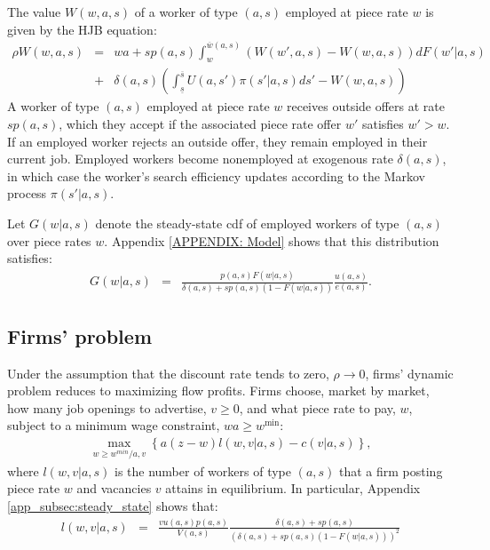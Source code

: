 The value $W(w,a,s)$ of a worker of type $(a,s)$ employed at piece rate $w$ is given by the HJB equation:
%
\begin{eqnarray}
  \label{eq: value of employment}
  \rho W(w,a,s)	&=& wa + sp(a,s)\int_{w}^{\overline{w}(a,s)}\left(W\left(w',a,s\right)-W\left(w,a,s\right)\right)dF\left(w'\left|a,s\right.\right) \\
  &+& \delta(a,s)\left( \int_{\underline{s}}^{\overline{s}} U\left(a,s'\right) \pi(s'|a,s)ds'-W(w,a,s)\right) \nonumber
\end{eqnarray}
%
A worker of type $(a,s)$ employed at piece rate $w$ receives outside offers at rate $sp(a,s)$, which they accept if the associated piece rate offer $w'$ satisfies $w' > w$. If an employed worker rejects an outside offer, they remain employed in their current job. Employed workers become nonemployed at exogenous rate $\delta(a,s)$, in which case the worker's search efficiency updates according to the Markov process $\pi(s'|a,s)$.

Let $G(w|a,s)$ denote the steady-state cdf of employed workers of type $(a,s)$ over piece rates $w$. Appendix \ref{APPENDIX: Model} shows that this distribution satisfies:
%
\begin{eqnarray}
  \label{eq: employment distribution}
  G\left(w|a,s\right) &= & \frac{p(a,s)F\left(w|a,s\right)}{\delta(a,s) + sp(a,s) \left(1-F\left(w|a,s\right)\right)}\frac{u(a,s)}{e(a,s)}.
\end{eqnarray}
%




\subsection{Firms' problem}

Under the assumption that the discount rate tends to zero, $\rho \to 0$, firms' dynamic problem reduces to maximizing flow profits. Firms choose, market by market, how many job openings to advertise, $v\geq 0$, and what piece rate to pay, $w$, subject to a minimum wage constraint, $wa \geq w^{\text{min}}$:
\begin{eqnarray}
  \label{eq: firm problem}
  \max_{w\geq w^{min}/a,v}\left\{ a \left(z-w\right)l\left(w,v|a,s\right)-c(v|a,s)\right\},
\end{eqnarray}
where $l(w,v|a,s)$ is the number of workers of type $(a,s)$ that a firm posting piece rate $w$ and vacancies $v$ attains in equilibrium. In particular, Appendix \ref{app_subsec:steady_state} shows that:
%
\begin{eqnarray}
  \label{eq: equilibrium size}
  l\left(w,v|a,s\right) &=& \frac{v u(a,s)p(a,s)}{V(a,s)} \frac{\delta(a,s) + sp(a,s)}{\left(\delta(a,s)+sp(a,s)(1-F(w|a,s))\right)^2}
\end{eqnarray}
%


